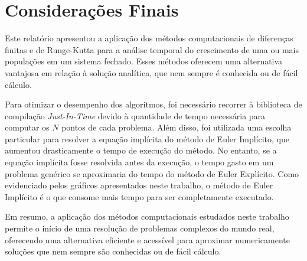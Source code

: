\section{Considerações Finais}\label{sec:conclusion}



Este relatório apresentou a aplicação dos métodos computacionais de diferenças finitas e de Runge-Kutta para a análise temporal do crescimento de uma ou mais populações em um sistema fechado. Esses métodos oferecem uma alternativa vantajosa em relação à solução analítica, que nem sempre é conhecida ou de fácil cálculo.

Para otimizar o desempenho dos algoritmos, foi necessário recorrer à biblioteca de compilação \emph{Just-In-Time} devido à quantidade de tempo necessária para computar os $N$ pontos de cada problema. Além disso, foi utilizada uma escolha particular para resolver a equação implícita do método de Euler Implícito, que aumentou drasticamente o tempo de execução do método. No entanto, se a equação implícita fosse resolvida antes da execução, o tempo gasto em um problema genérico se aproximaria do tempo do método de Euler Explícito. Como evidenciado pelos gráficos apresentados neste trabalho, o método de Euler Implícito é o que consome mais tempo para ser completamente executado.

Em resumo, a aplicação dos métodos computacionais estudados neste trabalho permite o início de uma resolução de problemas complexos do mundo real, oferecendo uma alternativa eficiente e acessível para aproximar numericamente soluções que nem sempre são conhecidas ou de fácil cálculo.